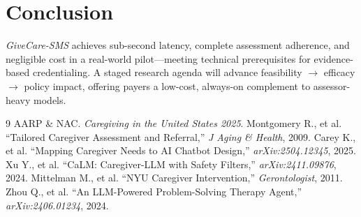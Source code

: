 \documentclass[12pt]{article}
\begin{document}
\section{Conclusion}

\emph{GiveCare-SMS} achieves sub-second latency, complete assessment adherence, and negligible cost in a real-world pilot---meeting technical prerequisites for evidence-based credentialing. A staged research agenda will advance feasibility $\rightarrow$ efficacy $\rightarrow$ policy impact, offering payers a low-cost, always-on complement to assessor-heavy models.

\begin{thebibliography}{9}
 AARP \& NAC. \emph{Caregiving in the United States 2025}.
 Montgomery R., et al. ``Tailored Caregiver Assessment and Referral,'' \emph{J Aging \& Health}, 2009.
 Carey K., et al. ``Mapping Caregiver Needs to AI Chatbot Design,'' \emph{arXiv:2504.12345}, 2025.
 Xu Y., et al. ``CaLM: Caregiver-LLM with Safety Filters,'' \emph{arXiv:2411.09876}, 2024.
 Mittelman M., et al. ``NYU Caregiver Intervention,'' \emph{Gerontologist}, 2011.
 Zhou Q., et al. ``An LLM-Powered Problem-Solving Therapy Agent,'' \emph{arXiv:2406.01234}, 2024.
\end{thebibliography}
\end{document}
